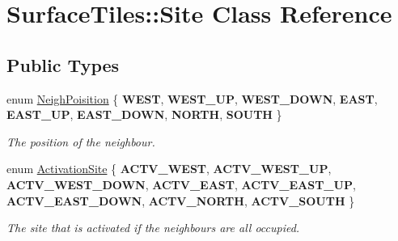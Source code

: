 \hypertarget{classSurfaceTiles_1_1Site}{}\section{Surface\+Tiles\+:\+:Site Class Reference}
\label{classSurfaceTiles_1_1Site}
\subsection*{Public Types}
\begin{DoxyCompactItemize}
\item 
\mbox{\label{classSurfaceTiles_1_1Site_a6cef4c767e7aa8320658fb3cd0fa3b1c}} 
enum \mbox{\hyperlink{classSurfaceTiles_1_1Site_a6cef4c767e7aa8320658fb3cd0fa3b1c}{Neigh\+Poisition}} \{ \newline
{\bfseries W\+E\+ST}, 
{\bfseries W\+E\+S\+T\+\_\+\+UP}, 
{\bfseries W\+E\+S\+T\+\_\+\+D\+O\+WN}, 
{\bfseries E\+A\+ST}, 
\newline
{\bfseries E\+A\+S\+T\+\_\+\+UP}, 
{\bfseries E\+A\+S\+T\+\_\+\+D\+O\+WN}, 
{\bfseries N\+O\+R\+TH}, 
{\bfseries S\+O\+U\+TH}
 \}
\begin{DoxyCompactList}\small\item\em The position of the neighbour. \end{DoxyCompactList}\item 
\mbox{\label{classSurfaceTiles_1_1Site_a459d18c54ed5cbe4db365a2a0a4b6492}} 
enum \mbox{\hyperlink{classSurfaceTiles_1_1Site_a459d18c54ed5cbe4db365a2a0a4b6492}{Activation\+Site}} \{ \newline
{\bfseries A\+C\+T\+V\+\_\+\+W\+E\+ST}, 
{\bfseries A\+C\+T\+V\+\_\+\+W\+E\+S\+T\+\_\+\+UP}, 
{\bfseries A\+C\+T\+V\+\_\+\+W\+E\+S\+T\+\_\+\+D\+O\+WN}, 
{\bfseries A\+C\+T\+V\+\_\+\+E\+A\+ST}, 
\newline
{\bfseries A\+C\+T\+V\+\_\+\+E\+A\+S\+T\+\_\+\+UP}, 
{\bfseries A\+C\+T\+V\+\_\+\+E\+A\+S\+T\+\_\+\+D\+O\+WN}, 
{\bfseries A\+C\+T\+V\+\_\+\+N\+O\+R\+TH}, 
{\bfseries A\+C\+T\+V\+\_\+\+S\+O\+U\+TH}
 \}
\begin{DoxyCompactList}\small\item\em The site that is activated if the neighbours are all occupied. \end{DoxyCompactList}\end{DoxyCompactItemize}
